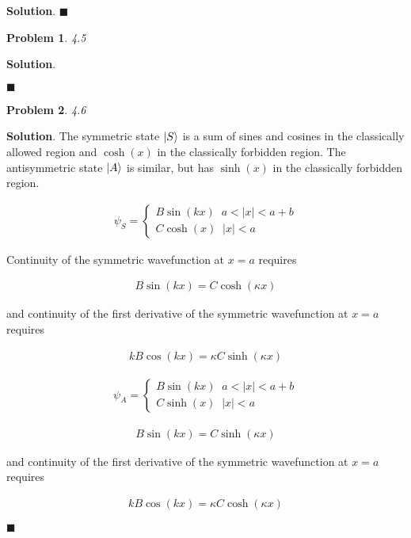 \documentclass[12pt]{article}
\newtheorem{p}{Problem}
\theoremstyle{definition}
\newenvironment{s}{%
        \begin{trivlist} \item \textbf{Solution}. }{%
            \hspace*{\fill} $\blacksquare$\end{trivlist}}%
\begin{document}
{\begin{s}
\end{s}

\begin{p}
4.5
\end{p}

\begin{s}

\end{s}

\begin{p}
4.6
\end{p}

\begin{s}
The symmetric state $\ket{S}$ is a sum of sines and cosines in the classically allowed region and $\cosh (x)$ in the classically forbidden region. The antisymmetric state $\ket{A}$ is similar, but has $\sinh (x)$ in the classically forbidden region. 

\begin{align*}
\psi_S = \begin{cases}
  B\sin(kx)  \;\;a < |x| < a+b\\
  C\cosh(x) \;\; |x| < a
\end{cases}
\end{align*}

Continuity of the symmetric wavefunction at $x = a$ requires

\begin{align*}
B\sin(kx) = C\cosh(\kappa x)
\end{align*}

and continuity of the first derivative of the symmetric wavefunction at $x = a$ requires

\begin{align*}
kB\cos(kx) = \kappa C\sinh(\kappa x)
\end{align*}

\begin{align*}
\psi_A = \begin{cases}
  B\sin(kx)  \;\;a < |x| < a+b\\
  C\sinh(x) \;\; |x| < a
\end{cases}
\end{align*}

\begin{align*}
B\sin(kx) = C\sinh(\kappa x)
\end{align*}

and continuity of the first derivative of the symmetric wavefunction at $x = a$ requires

\begin{align*}
kB\cos(kx) = \kappa C\cosh(\kappa x)
\end{align*}


\end{s}
\end{document}
